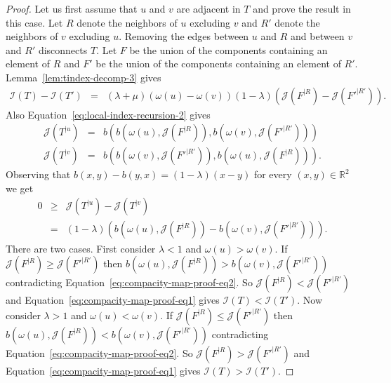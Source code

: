 \documentclass[11 pt]{modarticle}
\newcommand{\cR}{\mathbb{R}}
\newcommand{\wmap}{\omega}
\newcommand{\rtree}[2]{{#1}^{\lvert #2}}
\newcommand{\bilinear}{b}
\newcommand{\indexsymbol}{\mathcal{I}}
\newcommand{\tindex}[1]{\indexsymbol(#1)}
\newcommand{\rindexsymbol}{\mathcal{J}}
\newcommand{\rindex}[2]{\rindexsymbol(\rtree{#2}{#1})}
\begin{document}
\begin{proof}
Let us first assume that $u$ and $v$ are adjacent in $T$ and prove the result in this case. Let $R$ denote the neighbors of $u$ excluding $v$ and $R'$ denote the neighbors of $v$ excluding $u$. Removing the edges between $u$ and $R$ and between $v$ and $R'$ disconnects $T$. Let $F$ be the union of the components containing an element of $R$ and $F'$ be the union of the components containing an element of $R'$. Lemma~\ref{lem:tindex-decomp-3} gives
\begin{eqnarray}
	\tindex{T} - \tindex{T'} & = & (\lambda + \mu)(\wmap(u) - \wmap(v))(1 - \lambda)(\rindex{R}{F} - \rindex{R'}{F'}). \label{eq:compacity-map-proof-eq1}
\end{eqnarray}
Also Equation~\eqref{eq:local-index-recursion-2} gives
\begin{eqnarray*}
	\rindex{u}{T} & = & \bilinear(\bilinear(\wmap(u),\rindex{R}{F}), \bilinear(\wmap(v),\rindex{R'}{F'})) \\
	\rindex{v}{T} & = & \bilinear(\bilinear(\wmap(v),\rindex{R'}{F'}), \bilinear(\wmap(u),\rindex{R}{F})).
\end{eqnarray*}
Observing that $\bilinear(x, y) - \bilinear(y, x) = (1 - \lambda)(x-y)$ for every $(x, y) \in \cR^2$ we get
\begin{eqnarray}
	0 & \geq & \rindex{u}{T} - \rindex{v}{T} \nonumber \\
	& = & (1 - \lambda) \left(\bilinear(\wmap(u),\rindex{R}{F}) - \bilinear(\wmap(v),\rindex{R'}{F'})\right). \label{eq:compacity-map-proof-eq2}
\end{eqnarray}
There are two cases. First consider $\lambda < 1$ and $\wmap(u) > \wmap(v)$. If $\rindex{R}{F} \geq \rindex{R'}{F'}$ then $\bilinear(\wmap(u),\rindex{R}{F}) > \bilinear(\wmap(v),\rindex{R'}{F'})$ contradicting Equation~\eqref{eq:compacity-map-proof-eq2}. So $\rindex{R}{F} < \rindex{R'}{F'}$ and Equation~\eqref{eq:compacity-map-proof-eq1} gives $\tindex{T} < \tindex{T'}$. Now consider $\lambda > 1$ and $\wmap(u) < \wmap(v)$. If $\rindex{R}{F} \leq \rindex{R'}{F'}$ then $\bilinear(\wmap(u),\rindex{R}{F}) < \bilinear(\wmap(v),\rindex{R'}{F'})$ contradicting Equation~\eqref{eq:compacity-map-proof-eq2}. So $\rindex{R}{F} > \rindex{R'}{F'}$ and Equation~\eqref{eq:compacity-map-proof-eq1} gives $\tindex{T} > \tindex{T'}$.



\end{proof}
\end{document}
